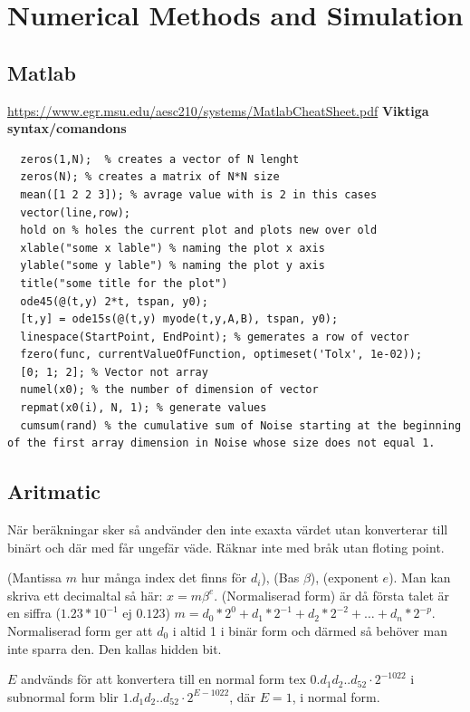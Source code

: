 \chapter{Numerical Methods and Simulation}

\newpage

\section{Matlab}
\url{https://www.egr.msu.edu/aesc210/systems/MatlabCheatSheet.pdf} \newline
\textbf{Viktiga syntax/comandons}
\begin{verbatim}
  zeros(1,N);  % creates a vector of N lenght
  zeros(N); % creates a matrix of N*N size
  mean([1 2 2 3]); % avrage value with is 2 in this cases
  vector(line,row); 
  hold on % holes the current plot and plots new over old
  xlable("some x lable") % naming the plot x axis
  ylable("some y lable") % naming the plot y axis
  title("some title for the plot")
  ode45(@(t,y) 2*t, tspan, y0);
  [t,y] = ode15s(@(t,y) myode(t,y,A,B), tspan, y0);
  linespace(StartPoint, EndPoint); % gemerates a row of vector
  fzero(func, currentValueOfFunction, optimeset('Tolx', 1e-02)); 
  [0; 1; 2]; % Vector not array
  numel(x0); % the number of dimension of vector
  repmat(x0(i), N, 1); % generate values 
  cumsum(rand) % the cumulative sum of Noise starting at the beginning of the first array dimension in Noise whose size does not equal 1.
\end{verbatim}


\section{Aritmatic}
När beräkningar sker så andvänder den inte exaxta värdet utan konverterar till binärt och där med får
ungefär väde. Räknar inte med bråk utan floting point.

(Mantissa $m$ hur många index det finns för $d_i$), (Bas $\beta$), (exponent $e$). Man kan skriva ett decimaltal så här: $x=m\beta^e$.
(Normaliserad form) är då första talet är en siffra ($1.23*10^{-1}$ ej $0.123$)
$m=d_0*2^0+d_1*2^{-1}+d_2*2^{-2}+ \ldots +d_n*2^{-p}$. Normaliserad form ger att $d_0$ i altid 1 i binär form och
därmed så behöver man inte sparra den. Den kallas hidden bit.

$E$ andvänds för att konvertera till en normal form tex $0.d_1d_2..d_{52}\cdot{2^{-1022}}$ i subnormal form blir
$1.d_1d_2..d_{52}\cdot{2^{E-1022}}$, där $E=1$, i normal form.

